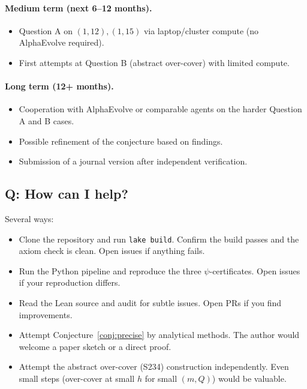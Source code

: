 \documentclass[11pt,a4paper]{article}
\theoremstyle{plain}
\theoremstyle{definition}
\begin{document}
\paragraph{Medium term (next 6--12 months).}
\begin{itemize}
   \item Question A on $(1, 12), (1, 15)$ via laptop/cluster
         compute (no AlphaEvolve required).
   \item First attempts at Question B (abstract over-cover)
         with limited compute.
\end{itemize}

\paragraph{Long term (12+ months).}
\begin{itemize}
   \item Cooperation with AlphaEvolve or comparable agents on
         the harder Question A and B cases.
   \item Possible refinement of the conjecture based on findings.
   \item Submission of a journal version after independent
         verification.
\end{itemize}

\subsection*{Q: How can I help?}

Several ways:
\begin{itemize}
   \item Clone the repository and run \texttt{lake build}.
         Confirm the build passes and the axiom check is clean.
         Open issues if anything fails.
   \item Run the Python pipeline and reproduce the three
         $\psi$-certificates. Open issues if your reproduction
         differs.
   \item Read the Lean source and audit for subtle issues.
         Open PRs if you find improvements.
   \item Attempt Conjecture~\ref{conj:precise} by analytical
         methods. The author would welcome a paper sketch or a
         direct proof.
   \item Attempt the abstract over-cover (S234) construction
         independently. Even small steps (over-cover at small $h$
         for small $(m, Q)$) would be valuable.
\end{itemize}
\end{document}
